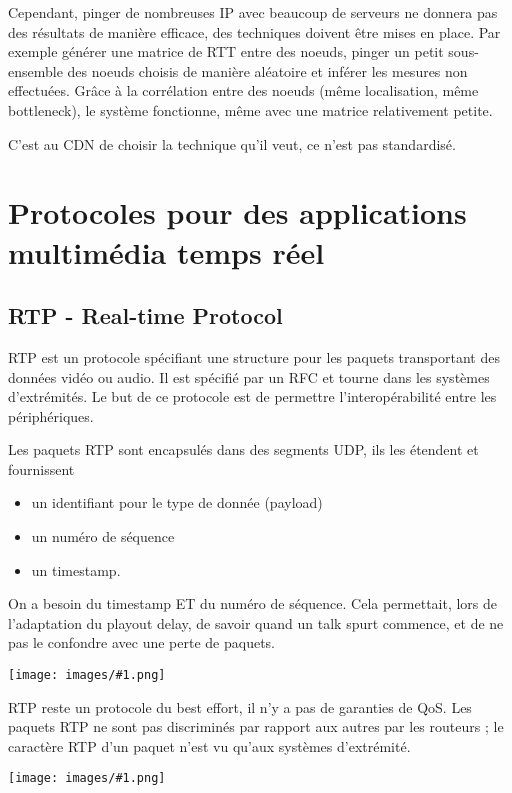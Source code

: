 \documentclass[10pt,a4paper]{report}
\newcommand{\dessin}[1]{\begin{center}\texttt{[image: images/\#1.png]}\end{center}}
\newcommand{\dessinS}[2]{\begin{center}\texttt{[image: images/\#1.png]}\end{center}}
\begin{document}
			Cependant, pinger de nombreuses IP avec beaucoup de serveurs ne donnera pas des résultats de manière efficace, des techniques doivent être mises en place. Par exemple générer une matrice de RTT entre des noeuds, pinger un petit sous-ensemble des noeuds choisis de manière aléatoire et inférer les mesures non effectuées. Grâce à la corrélation entre des noeuds (même localisation, même bottleneck), le système fonctionne, même avec une matrice relativement petite.
			
			C'est au CDN de choisir la technique qu'il veut, ce n'est pas standardisé.
			
	\section{Protocoles pour des applications multimédia temps réel}
		
		\subsection{RTP - Real-time Protocol}
		
		RTP est un protocole spécifiant une structure pour les paquets transportant des données vidéo ou audio. Il est spécifié par un RFC et tourne dans les systèmes d'extrémités. Le but de ce protocole est de permettre l'interopérabilité entre les périphériques.
		
		Les paquets RTP sont encapsulés dans des segments UDP, ils les étendent et fournissent
		
		\begin{itemize}
			\item un identifiant pour le type de donnée (payload)
			\item un numéro de séquence
			\item un timestamp.
		\end{itemize}
		
		On a besoin du timestamp ET du numéro de séquence. Cela permettait, lors de l'adaptation du playout delay, de savoir quand un talk spurt commence, et de ne pas le confondre avec une perte de paquets.
		
		\dessin{86}
				
		RTP reste un protocole du best effort, il n'y a pas de garanties de QoS. Les paquets RTP ne sont pas discriminés par rapport aux autres par les routeurs ; le caractère RTP d'un paquet n'est vu qu'aux systèmes d'extrémité.
		
		\dessinS{87}{.8}
		
\end{document}
